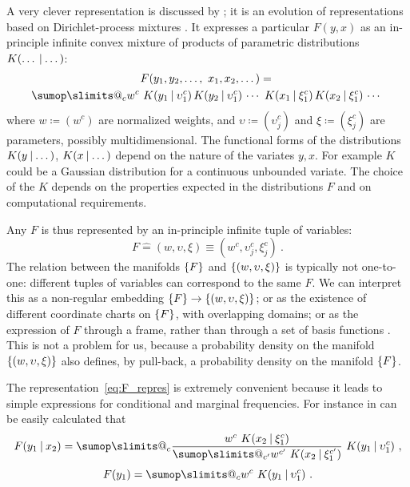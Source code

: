 \documentclass[\ifafour a4paper,12pt,\else a5paper,10pt,\fi%
onecolumn,oneside,article,%
british%
]{memoir}
\makeatletter
\theoremstyle{remark}
\theoremstyle{innote}
\def\sum{\DOTSI\sumop\slimits@}
\newcommand*{\defd}{\coloneqq}
\newcommand*{\corr}{\mathrel{\hat{=}}}%
\DeclarePairedDelimiter\set{\{}{\}} %
\renewcommand*{\|}[1][]{\nonscript\:#1\vert\nonscript\:\mathopen{}}
\newcommand*{\chap}{ch.}%
\newcommand*{\eg}{{e.g.}}
\makeatother
\begin{document}
A very clever representation is discussed by \textcites{dunsonetal2011}\autocites[see also][]{bhattacharyaetal2012,rossi2014}; it is an evolution of representations based on Dirichlet-process mixtures \autocites[\eg][]{antoniak1974,ferguson1983,escobaretal1995,muelleretal1996,rasmussen1999}. It expresses a particular $F(y,x)$ as an in-principle infinite convex mixture of products of parametric distributions $K(\dotso \| \dotso)$:
\begin{multline}
  \label{eq:F_repres}
  F(y_{1},y_{2}, \dotsc,\ x_{1}, x_{2}, \dotsc) ={}\\
  \sum_{c} w^{c}\
  K(y_{1} \| \upsilon^{c}_{1})\,  K(y_{2} \| \upsilon^{c}_{1})\, \dotsm\ 
  K(x_{1} \| \xi^{c}_{1})\,  K(x_{2} \| \xi^{c}_{1})\, \dotsm\ 
\end{multline}
where $w\defd (w^{c})$ are normalized weights, and $\upsilon \defd (\upsilon^{c}_{j})$ and $\xi \defd (\xi^{c}_{j})$ are parameters, possibly multidimensional. The functional forms of the distributions $K(y \| \dotso)$, $K(x \| \dotso)$ depend on the nature of the variates $y,x$. For example $K$ could be a Gaussian distribution for a continuous unbounded variate. The choice of the $K$ depends on the properties expected in the distributions $F$ and on computational requirements.

Any $F$ is thus represented by an in-principle infinite tuple of variables:
\begin{equation}
  \label{eq:F_coords}
  F \corr (w, \upsilon, \xi) \equiv (w^{c}, \upsilon^{c}_{j}, \xi^{c}_{j}) \ .
\end{equation}
The relation between the manifolds $\set{F}$ and $\set{(w, \upsilon, \xi)}$ is typically not one-to-one: different tuples of variables can correspond to the same $F$. We can interpret this as a non-regular embedding $\set{F} \to \set{(w, \upsilon, \xi)}$; or as the existence of different coordinate charts on $\set{F}$, with overlapping domains; or as the expression of $F$ through a frame\autocites{balanetal2006}[\chap~8]{heil1998_r2011}[\chap~3]{daubechies1992_r1999}, rather than through a set of basis functions . This is not a problem for us, because a probability density on the manifold $\set{(w, \upsilon, \xi)}$ also defines, by pull-back, a probability density on the manifold $\set{F}$.

The representation~\eqref{eq:F_repres} is extremely convenient because it leads to simple expressions for conditional and marginal frequencies. For instance in can be easily calculated that
\begin{gather}
  \label{eq:Fconditional_example}
  F(y_{1} \| x_{2}) =
  \sum_{c}
  \frac{ w^{c}\ K(x_{2} \| \xi^{c}_{1})}{
   \sum_{c'} w^{c'}\ K(x_{2} \| \xi^{c'}_{1})
}\ 
  K(y_{1} \| \upsilon^{c}_{1}) \ ,
\\[\jot]
  F(y_{1}) =
  \sum_{c} w^{c}\ K(y_{1} \| \upsilon^{c}_{1}) \ .
\end{gather}
\end{document}
